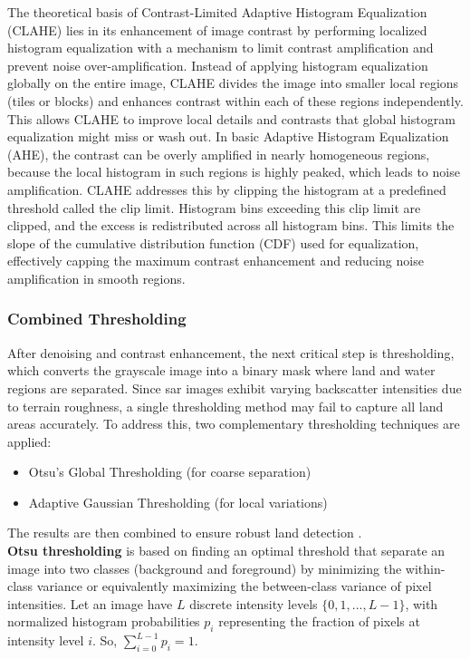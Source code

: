 \documentclass{article}
\begin{document}
	The theoretical basis of Contrast-Limited Adaptive Histogram Equalization (CLAHE) lies in its enhancement of image contrast by performing localized histogram equalization with a mechanism to limit contrast amplification and prevent noise over-amplification. Instead of applying histogram equalization globally on the entire image, CLAHE divides the image into smaller local regions (tiles or blocks) and enhances contrast within each of these regions independently. This allows CLAHE to improve local details and contrasts that global histogram equalization might miss or wash out. In basic Adaptive Histogram Equalization (AHE), the contrast can be overly amplified in nearly homogeneous regions, because the local histogram in such regions is highly peaked, which leads to noise amplification. CLAHE addresses this by clipping the histogram at a predefined threshold called the clip limit. Histogram bins exceeding this clip limit are clipped, and the excess is redistributed across all histogram bins. This limits the slope of the cumulative distribution function (CDF) used for equalization, effectively capping the maximum contrast enhancement and reducing noise amplification in smooth regions. 
	
	\subsubsection{Combined Thresholding}
	After denoising and contrast enhancement, the next critical step is thresholding, which converts the grayscale image into a binary mask where land and water regions are separated. Since \acrshort{sar} images exhibit varying backscatter intensities due to terrain roughness, a single thresholding method may fail to capture all land areas accurately. To address this, two complementary thresholding techniques are applied:
	\begin{itemize}
		\item Otsu’s Global Thresholding (for coarse separation)
		\item Adaptive Gaussian Thresholding (for local variations)
	\end{itemize}
	The results are then combined to ensure robust land detection \cite{4310076}. \\
	
	\textbf{Otsu thresholding} is based on finding an optimal threshold that separate an image into two classes (background and foreground) by minimizing the within-class variance or equivalently maximizing the between-class variance of pixel intensities. Let an image have \( L \) discrete intensity levels \(\{0, 1, ..., L - 1\}\), with normalized histogram probabilities \( p_i \) representing the fraction of pixels at intensity level \( i \). So, \(\sum_{i=0}^{L-1} p_i = 1\).
	
\end{document}
